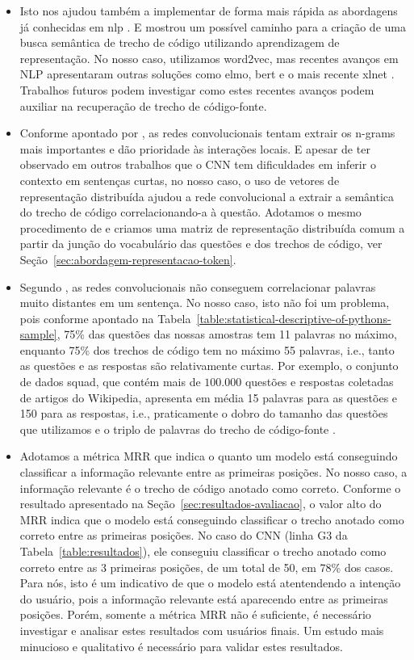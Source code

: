 \begin{itemize}
    \item Isto nos ajudou também a implementar de forma mais rápida as abordagens já conhecidas em \acrshort{nlp} \citep{feng-2015, tan-lstm-qa}. E mostrou um possível caminho para a criação de uma busca semântica de trecho de código utilizando aprendizagem de representação. No nosso caso, utilizamos \Gls{word2vec}, mas recentes avanços em NLP apresentaram outras soluções como \acrshort{elmo}, \acrshort{bert} e o mais recente \Gls{xlnet} \citep{yang2019xlNet, devlin-etal-2019-bert}. Trabalhos futuros podem investigar como estes recentes avanços podem auxiliar na recuperação de trecho de código-fonte.
    \item Conforme apontado por \cite{tom-young:trends-deep-learning-nlp}, as redes convolucionais tentam extrair os n-grams mais importantes e dão prioridade às interações locais. E apesar de \cite{tom-young:trends-deep-learning-nlp} ter observado em outros trabalhos que o CNN tem dificuldades em inferir o contexto em sentenças curtas, no nosso caso, o uso de vetores de representação distribuída ajudou a rede convolucional a extrair a semântica do trecho de código correlacionando-a à questão. Adotamos o mesmo procedimento de \cite{tan-lstm-qa} e criamos uma matriz de representação distribuída comum a partir da junção do vocabulário das questões e dos trechos de código, ver Seção~\ref{sec:abordagem-representacao-token}.
    \item Segundo \cite{Goodfellow-et-al-2016:convolutional-networks}, as redes convolucionais não conseguem correlacionar palavras muito distantes em um sentença. No nosso caso, isto não foi um problema, pois conforme apontado na Tabela~\ref{table:statistical-descriptive-of-pythons-sample}, 75\% das questões das nossas amostras tem 11 palavras no máximo, enquanto 75\% dos trechos de código tem no máximo 55 palavras, i.e., tanto as questões e as respostas são relativamente curtas. Por exemplo, o conjunto de dados \acrshort{squad}, que contém mais de $100.000$ questões e respostas coletadas de artigos do Wikipedia, apresenta em média 15 palavras para as questões e 150 para as respostas, i.e., praticamente o dobro do tamanho das questões que utilizamos e o triplo de palavras do trecho de código-fonte \citep{rajpurkar-etal-2016-squad}. 
    \item Adotamos a métrica MRR que indica o quanto um modelo está conseguindo classificar a informação relevante entre as primeiras posições. No nosso caso, a informação relevante é o trecho de código anotado como correto. Conforme o resultado apresentado na Seção~\ref{sec:resultados-avaliacao}, o valor alto do MRR indica que o modelo está conseguindo classificar o trecho anotado como correto entre as primeiras posições. No caso do CNN (linha G3 da Tabela~\ref{table:resultados}), ele conseguiu classificar o trecho anotado como correto entre as 3 primeiras posições, de um total de 50, em 78\% dos casos. Para nós, isto é um indicativo de que o modelo está atentendendo a intenção do usuário, pois a informação relevante está aparecendo entre as primeiras posições. Porém, somente a métrica MRR não é suficiente, é necessário investigar e analisar estes resultados com usuários finais. Um estudo mais minucioso e qualitativo é necessário para validar estes resultados.
\end{itemize}


